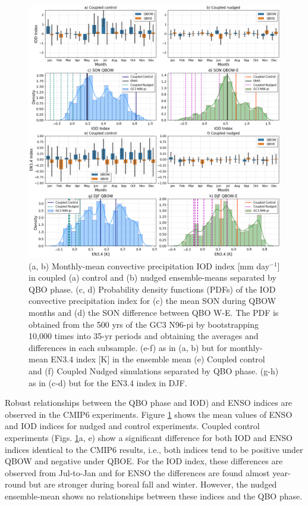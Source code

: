 \begin{figure}[t!]
\centering
 \includegraphics[width=0.97\linewidth]{figures/iod_suites.png}
\caption[IOD and ENSO indices in nudged versus control experiments]{(a, b) Monthly-mean convective precipitation IOD index [mm day$^{-1}$] in coupled (a) control and (b) nudged ensemble-means separated by QBO phase. (c, d) Probability density functions (PDFs) of the IOD convective precipitation index for (c) the mean SON during QBOW months and (d) the SON difference between QBO W-E. The PDF is obtained from the 500 yrs of the GC3 N96-pi by bootstrapping 10,000 times into 35-yr periods and obtaining the averages and differences in each subsample. (e-f) as in (a, b) but for monthly-mean EN3.4 index [K] in the ensemble mean (e) Coupled control and (f) Coupled Nudged simulations separated by QBO phase. (g-h) as in (c-d) but for the EN3.4 index in DJF. }
\label{fig:iod_suites}
\end{figure}

Robust relationships between the QBO phase and IOD) and ENSO indices are observed in the CMIP6 experiments.
Figure \ref{fig:iod_suites} shows the mean values of ENSO and IOD indices for nudged and control experiments. Coupled control experiments (Figs. \ref{fig:iod_suites}a, e) show a significant difference for both IOD and ENSO indices identical to the CMIP6 results, i.e., both indices tend to be positive under QBOW and negative under QBOE. For the IOD index, these differences are observed from Jul-to-Jan and for ENSO the differences are found almost year-round but are stronger during boreal fall and winter. However, the nudged ensemble-mean shows no relationships between these indices and the QBO phase.


